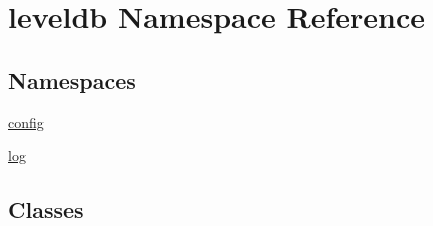 \hypertarget{namespaceleveldb}{}\section{leveldb Namespace Reference}
\label{namespaceleveldb}
\subsection*{Namespaces}
\begin{DoxyCompactItemize}
\item 
 \mbox{\hyperlink{namespaceleveldb_1_1config}{config}}
\item 
 \mbox{\hyperlink{namespaceleveldb_1_1log}{log}}
\end{DoxyCompactItemize}
\subsection*{Classes}
